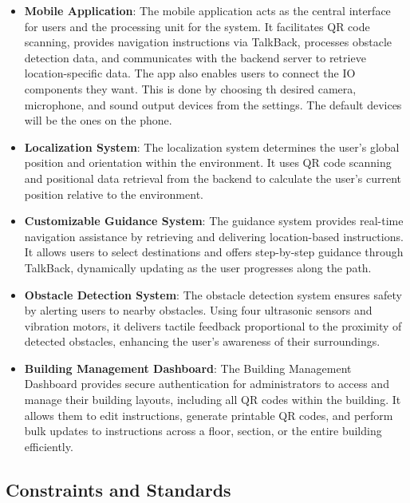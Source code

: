 \begin{itemize}
	\item \textbf{Mobile Application}: The mobile application acts as the central interface for users and the processing unit for the system. It facilitates QR code scanning, provides navigation instructions via TalkBack, processes obstacle detection data, and communicates with the backend server to retrieve location-specific data. The app also enables users to connect the IO components they want. This is done by choosing th desired camera, microphone, and sound output devices from the settings. The default devices will be the ones on the phone.
	
	\item \textbf{Localization System}: The localization system determines the user’s global position and orientation within the environment. It uses QR code scanning and positional data retrieval from the backend to calculate the user’s current position relative to the environment.
	
	\item \textbf{Customizable Guidance System}: The guidance system provides real-time navigation assistance by retrieving and delivering location-based instructions. It allows users to select destinations and offers step-by-step guidance through TalkBack, dynamically updating as the user progresses along the path.
	
	\item \textbf{Obstacle Detection System}: The obstacle detection system ensures safety by alerting users to nearby obstacles. Using four ultrasonic sensors and vibration motors, it delivers tactile feedback proportional to the proximity of detected obstacles, enhancing the user's awareness of their surroundings.


	\item \textbf{Building Management Dashboard}: The Building Management Dashboard provides secure authentication for administrators to access and manage their building layouts, including all QR codes within the building. It allows them to edit instructions, generate printable QR codes, and perform bulk updates to instructions across a floor, section, or the entire building efficiently.
	
\end{itemize}

\subsection{Constraints and Standards}

